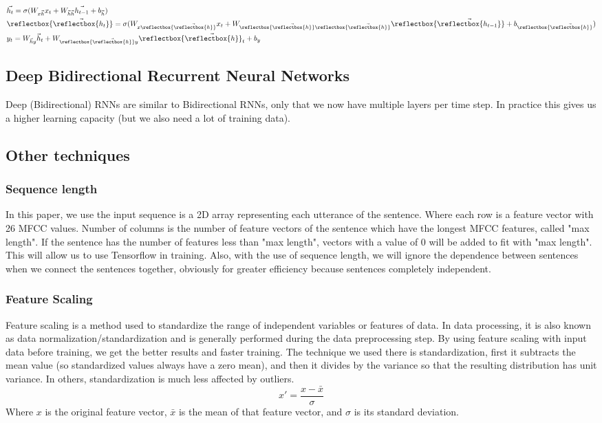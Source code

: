 \documentclass[conference]{IEEEtran}
\newcommand{\cev}[1]{\reflectbox{\ensuremath{\vec{\reflectbox{\ensuremath{#1}}}}}}
\begin{document}
\begin{align*}
	&\vec{h_t} = \sigma (W_{x\vec{h}}x_t + W_{\vec{h}\vec{h}}\vec{h_{t-1}} + b_{\vec{h}})\\
	&\cev{h_t} = \sigma (W_{x\cev{h}}x_t + W_{\cev{h}\cev{h}}\cev{h_{t-1}} + b_{\cev{h}})\\
	&y_t = W_{\vec{h}y}\vec{h}_t + W_{\cev{h}y}\cev{h}_t + b_y
\end{align*}

\subsection{Deep Bidirectional Recurrent Neural Networks}
Deep (Bidirectional) RNNs are similar to Bidirectional RNNs, only that we now have multiple layers per time step. In practice this gives us a higher learning capacity (but we also need a lot of training data).


\subsection{Other techniques}
\subsubsection{Sequence length}

In this paper, we use the input sequence is a 2D array representing each utterance of the sentence. Where each row is a feature vector with 26 MFCC values. Number of columns is the number of feature vectors of the sentence which have the longest MFCC features, called "max length". If the sentence has the number of features less than "max length", vectors with a value of 0 will be added to fit with "max length". This will allow us to use Tensorflow in training. Also, with the use of sequence length, we will ignore the dependence between sentences when we connect the sentences together, obviously for greater efficiency because sentences completely independent.
\subsubsection{Feature Scaling}
Feature scaling is a method used to standardize the range of independent variables or features of data. In data processing, it is also known as data normalization/standardization and is generally performed during the data preprocessing step. By using feature scaling with input data before training, we get the better results and faster training. The technique we used there is standardization, first it subtracts the mean value (so standardized values always have a zero mean), and then it divides by the variance so that the resulting distribution has unit variance. In others, standardization is much less affected by outliers.
\begin{equation}
	x' = \frac{x - \bar{x}}{\sigma}
\end{equation}
Where ${\displaystyle x}$ is the original feature vector, ${\displaystyle {\bar {x}}}$ is the mean of that feature vector, and ${\displaystyle \sigma }$ is its standard deviation.
\end{document}
